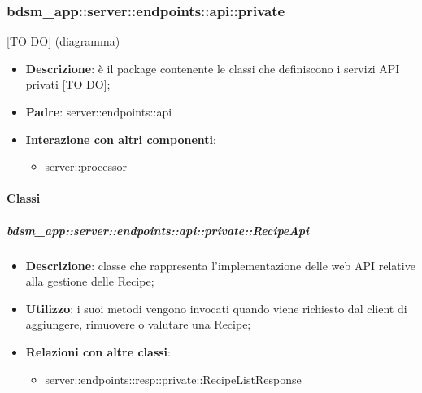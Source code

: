 \subsubsection{bdsm\_app::server::endpoints::api::private} %
\label{ssub:bdsm_app_server_endpoints_api_private}
[TO DO] (diagramma) \newline \newline

\begin{itemize}
  \item \textbf{Descrizione}: è il package contenente le classi che definiscono i servizi API privati [TO DO];
  \item \textbf{Padre}: server::endpoints::api
  \item \textbf{Interazione con altri componenti}:
  	\begin{itemize}
        \item server::processor
    \end{itemize}
\end{itemize}

	\paragraph{Classi} %

    \subparagraph{bdsm\_app::server::endpoints::api::private::RecipeApi} %
    \label{subp:bdsm_app_server_endpoints_api_private_recipeapi}
    \begin{itemize}
      \item \textbf{Descrizione}: classe che rappresenta l'implementazione delle web API relative alla gestione delle Recipe;
      \item \textbf{Utilizzo}: i suoi metodi vengono invocati quando viene richiesto dal client di aggiungere, rimuovere o valutare una Recipe;
      \item \textbf{Relazioni con altre classi}:
        \begin{itemize}
          \item server::endpoints::resp::private::RecipeListResponse
        \end{itemize}
      \end{itemize}

